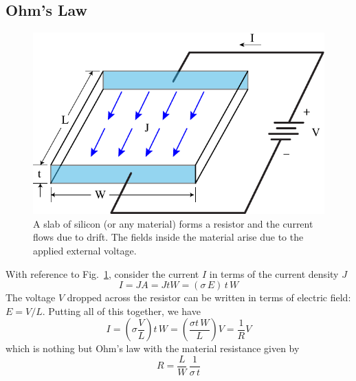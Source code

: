 \subsection{Ohm’s Law}
\begin{figure}[tb]
\centering
\includegraphics[width=.5\columnwidth]{ohms_law_slab}
\caption{A slab of silicon (or any material) forms a resistor and the current flows due to drift.  The fields inside the material arise due to the applied external voltage.}
\label{fig:ohms_law_slab}
\end{figure}
With reference to Fig.~\ref{fig:ohms_law_slab}, consider the current $I$ in terms of the current density $J$
    \begin{equation}
         I = JA = JtW = (\sigma \,E) \,t\,W
    \end{equation}   
The voltage $V$ dropped across the resistor can be written in terms of electric field:  $E = V/L$.  Putting all of this together, we have
    \begin{equation} 
        I =  \left( \sigma\frac{V}{L} \right) t\,W = \left( \frac{\sigma t\,W} {L} \right)  V= \frac{1}{R} V
    \end{equation}
which is nothing but Ohm's law with the material resistance given by
    \begin{equation} 
        R = \frac{L}{W}\,\frac{1}{{\sigma \,t}} 
    \end{equation}
